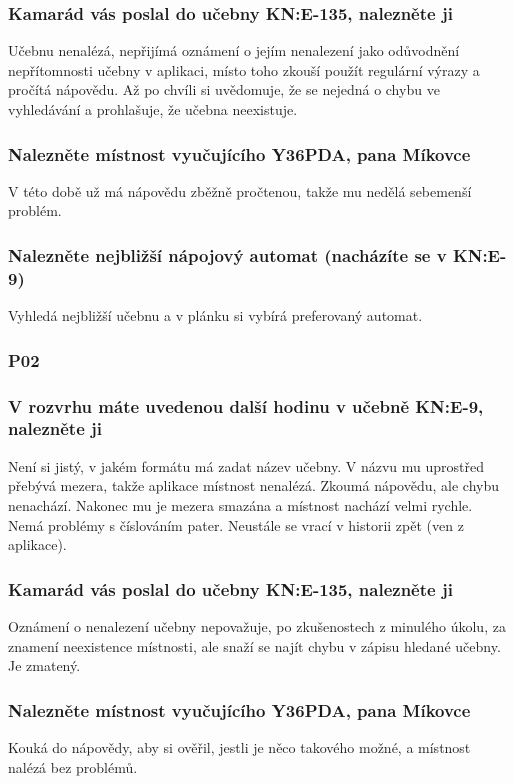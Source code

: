 \subsubsection*{Kamarád vás poslal do učebny KN:E-135, nalezněte ji}
Učebnu nenalézá, nepřijímá oznámení o jejím nenalezení jako odůvodnění nepřítomnosti učebny v aplikaci, místo toho zkouší použít regulární výrazy a pročítá nápovědu. Až po chvíli si uvědomuje, že se nejedná o chybu ve vyhledávání a prohlašuje, že učebna neexistuje.
\subsubsection*{Nalezněte místnost vyučujícího Y36PDA, pana Míkovce}
V této době už má nápovědu zběžně pročtenou, takže mu nedělá sebemenší problém.
\subsubsection*{Nalezněte nejbližší nápojový automat (nacházíte se v KN:E-9)}
Vyhledá nejbližší učebnu a v plánku si vybírá preferovaný automat.

\subsubsection{P02}
\subsubsection*{V rozvrhu máte uvedenou další hodinu v učebně KN:E-9, nalezněte ji}
Není si jistý, v jakém formátu má zadat název učebny. V názvu mu uprostřed přebývá mezera, takže aplikace místnost nenalézá. Zkoumá nápovědu, ale chybu nenachází. Nakonec mu je mezera smazána a místnost nachází velmi rychle. Nemá problémy s číslováním pater. Neustále se vrací v historii zpět (ven z aplikace).
\subsubsection*{Kamarád vás poslal do učebny KN:E-135, nalezněte ji}
Oznámení o nenalezení učebny nepovažuje, po zkušenostech z minulého úkolu, za znamení neexistence místnosti, ale snaží se najít chybu v zápisu hledané učebny. Je zmatený.
\subsubsection*{Nalezněte místnost vyučujícího Y36PDA, pana Míkovce}
Kouká do nápovědy, aby si ověřil, jestli je něco takového možné, a místnost nalézá bez problémů.
